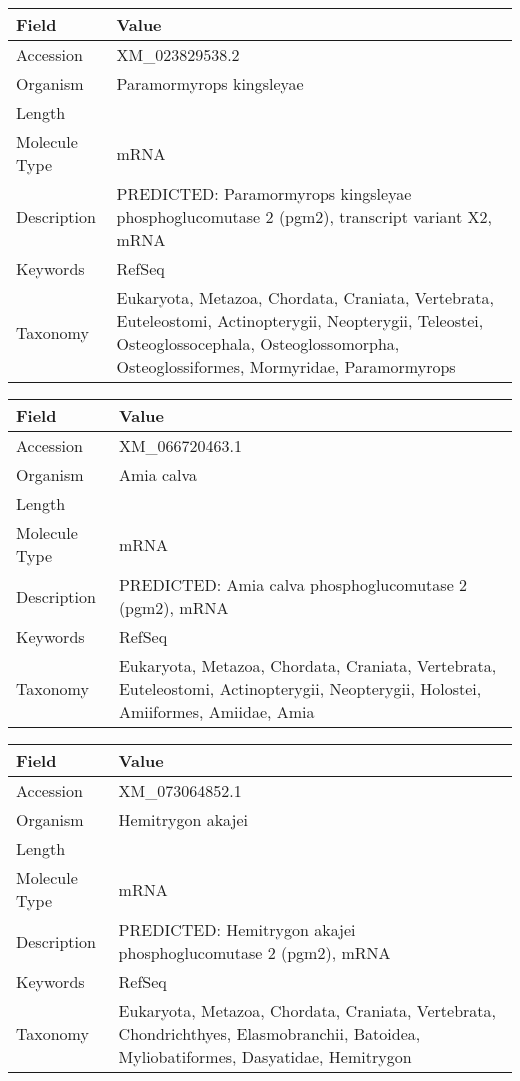 \documentclass[10pt]{article}
\begin{document}
{\footnotesize
\begin{longtable}{>{\raggedright\arraybackslash}p{4.5cm} >{\raggedright\arraybackslash}p{11.5cm}}
\textbf{Field} & \textbf{Value} \\
\hline
Accession & XM\_023829538.2 \\
Organism & Paramormyrops kingsleyae \\
Length & 3107 \\
Molecule Type & mRNA \\
Description & PREDICTED: Paramormyrops kingsleyae phosphoglucomutase 2 (pgm2), transcript variant X2, mRNA \\
Keywords & RefSeq \\
Taxonomy & Eukaryota, Metazoa, Chordata, Craniata, Vertebrata, Euteleostomi, Actinopterygii, Neopterygii, Teleostei, Osteoglossocephala, Osteoglossomorpha, Osteoglossiformes, Mormyridae, Paramormyrops \\
\end{longtable}
}

{\footnotesize
\begin{longtable}{>{\raggedright\arraybackslash}p{4.5cm} >{\raggedright\arraybackslash}p{11.5cm}}
\textbf{Field} & \textbf{Value} \\
\hline
Accession & XM\_066720463.1 \\
Organism & Amia calva \\
Length & 4710 \\
Molecule Type & mRNA \\
Description & PREDICTED: Amia calva phosphoglucomutase 2 (pgm2), mRNA \\
Keywords & RefSeq \\
Taxonomy & Eukaryota, Metazoa, Chordata, Craniata, Vertebrata, Euteleostomi, Actinopterygii, Neopterygii, Holostei, Amiiformes, Amiidae, Amia \\
\end{longtable}
}

{\footnotesize
\begin{longtable}{>{\raggedright\arraybackslash}p{4.5cm} >{\raggedright\arraybackslash}p{11.5cm}}
\textbf{Field} & \textbf{Value} \\
\hline
Accession & XM\_073064852.1 \\
Organism & Hemitrygon akajei \\
Length & 3634 \\
Molecule Type & mRNA \\
Description & PREDICTED: Hemitrygon akajei phosphoglucomutase 2 (pgm2), mRNA \\
Keywords & RefSeq \\
Taxonomy & Eukaryota, Metazoa, Chordata, Craniata, Vertebrata, Chondrichthyes, Elasmobranchii, Batoidea, Myliobatiformes, Dasyatidae, Hemitrygon \\
\end{longtable}
}
\end{document}
